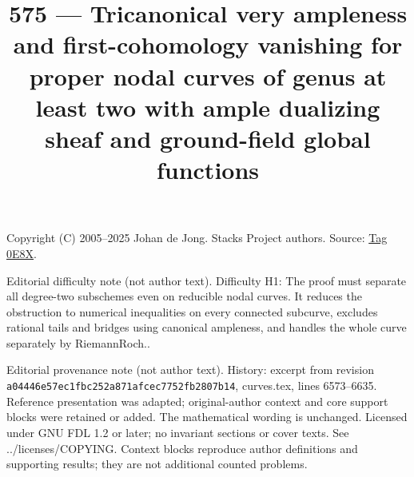 \documentclass{amsart}
\theoremstyle{plain}
\theoremstyle{definition}
\theoremstyle{remark}
\numberwithin{equation}{subsection}
\begin{document}
\title[Stacks Project, Tag 0E8X]{575 --- Tricanonical very ampleness and first-cohomology vanishing for proper nodal curves of genus at least two with ample dualizing sheaf and ground-field global functions}
\maketitle
\noindent Copyright (C) 2005--2025 Johan de Jong. Stacks Project authors. Source: \href{https://stacks.math.columbia.edu/tag/0E8X}{Tag 0E8X}.

\noindent Editorial difficulty note (not author text). Difficulty H1: The proof must separate all degree-two subschemes even on reducible nodal curves. It reduces the obstruction to numerical inequalities on every connected subcurve, excludes rational tails and bridges using canonical ampleness, and handles the whole curve separately by Riemann\textendash{}Roch..

\noindent Editorial provenance note (not author text). History: excerpt from revision \texttt{a0444\allowbreak 6e57e\allowbreak c1fbc\allowbreak 252a8\allowbreak 71afc\allowbreak ec775\allowbreak 2fb28\allowbreak 07b14}, curves.tex, lines 6573--6635. Reference presentation was adapted; original-author context and core support blocks were retained or added. The mathematical wording is unchanged. Licensed under GNU FDL 1.2 or later; no invariant sections or cover texts. See ../licenses/COPYING. Context blocks reproduce author definitions and supporting results; they are not additional counted problems.
\end{document}
